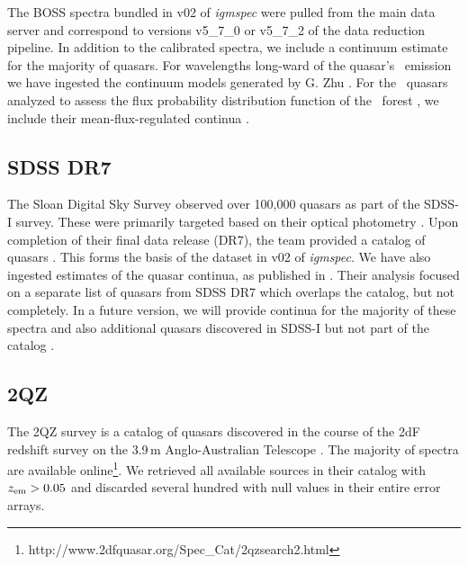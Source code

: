 \documentclass[12pt]{elsarticle}
\begin{document}
The BOSS spectra bundled in v02 of {\it igmspec} were pulled
from the main data server and correspond to versions 
v5\_7\_0 or v5\_7\_2 of the data reduction pipeline.
In addition to the calibrated spectra, we include a
continuum estimate for the majority of quasars.  
For wavelengths long-ward of the quasar's \lya\ emission we 
have ingested
the continuum models generated by G. Zhu 
\citep[see][for details on the algorithm]{zhu+14}.
For the \nlee~quasars analyzed to assess
the flux probability distribution function of the 
\lya\ forest \cite{lee+13}, we include their 
mean-flux-regulated continua \citep{lee+12}.

%
\subsection{SDSS DR7}
\label{sec:dr7}

The Sloan Digital Sky Survey observed over 100,000 quasars
as part of the SDSS-I survey.  These were primarily targeted
based on their optical photometry \citep[e.g.][]{richards09}.  
Upon completion of their final data release (DR7),
the team provided a catalog of quasars \citep{sdss_qso_dr7}.
This forms the basis of the dataset in v02 of {\it igmspec}.
We have also ingested estimates of the quasar continua, as
published in \cite{zhu+14}.  Their analysis focused on a 
separate list of quasars from SDSS DR7 which overlaps the 
\cite{sdss_qso_dr7} catalog, but not completely. 
In a future version, we will provide continua for the majority
of these spectra and also additional quasars discovered in 
SDSS-I but not part of the catalog \cite{sdss_qso_dr7}.



\subsection{2QZ}
\label{sec:2qz}

The 2QZ survey is a catalog of quasars discovered in the 
course of the 2dF redshift survey on the 3.9\,m
Anglo-Australian Telescope \citep{croom01}.  The
majority of spectra are available online\footnote{http://www.2dfquasar.org/Spec\_Cat/2qzsearch2.html}.
We retrieved all available sources in their catalog 
with $z_{\rm em}> 0.05$ and discarded several hundred with
null values in their entire error arrays.
\end{document}
